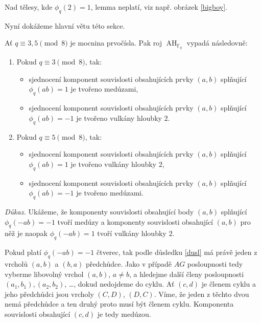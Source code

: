 \documentclass[12pt]{report}
\DeclareMathOperator{\AH}{AH}
\begin{document}
\begin{poznamka}
Nad tělesy, kde $\phi_q(2) =1$, lemma neplatí, viz např. obrázek \ref{bigboy}. 
\end{poznamka}

Nyní dokážeme hlavní větu této sekce.

\begin{veta}\label{big}
Ať $q \equiv 3,5 \pmod{8}$ je mocnina prvočísla. Pak roj $\AH_{\mathbb{F}_q}$ vypadá následovně:
\begin{enumerate}
\item Pokud $q \equiv 3 \pmod{8}$, tak:
\begin{itemize}
\item sjednocení komponent souvislosti obsahujících prvky $(a,b)$ splňující $\phi_q(ab) = 1$ je tvořeno medúzami,
\item sjednocení komponent souvislosti obsahujících prvky $(a,b)$ splňující $\phi_q(ab) = -1$ je tvořeno vulkány hloubky $2$.
\end{itemize}
\item Pokud $q \equiv 5 \pmod{8}$, tak:
\begin{itemize}
\item sjednocení komponent souvislosti obsahujících prvky $(a,b)$ splňující $\phi_q(ab) = 1$ je tvořeno vulkány hloubky $2$,
\item sjednocení komponent souvislosti obsahujících prvky $(a,b)$ splňující $\phi_q(ab) = -1$ je tvořeno medúzami.
\end{itemize}
\end{enumerate}

\end{veta}

\noindent \textit{Důkaz.} Ukážeme, že komponenty souvislosti obsahující body $(a,b)$ splňující $\phi_q(-ab) = -1$ tvoří medúzy a komponenty souvislosti obsahující $(a,b)$ pro něž je naopak $\phi_q(-ab)=1$ tvoří vulkány hloubky $2$.


Pokud platí $\phi_q(-ab) =-1$ čtverec, tak podle důsledku \ref{dusl} má právě jeden z vrcholů $(a,b)$ a $(b,a)$ předchůdce. Jako v případě $AG$ posloupnosti tedy vyberme libovolný vrchol $(a,b)$, $a \neq b$, a hledejme další členy posloupnosti $(a_1,b_1), (a_2,b_2)$, \dots, dokud nedojdeme do cyklu. Ať $(c,d)$ je členem cyklu a jeho předchůdci jsou vrcholy $(C,D)$, $(D,C)$. Víme, že jeden z těchto dvou nemá předchůdce a ten druhý proto musí být členem cyklu. Komponenta souvislosti obsahující $(c,d)$ je tedy medúzou.
\end{document}
